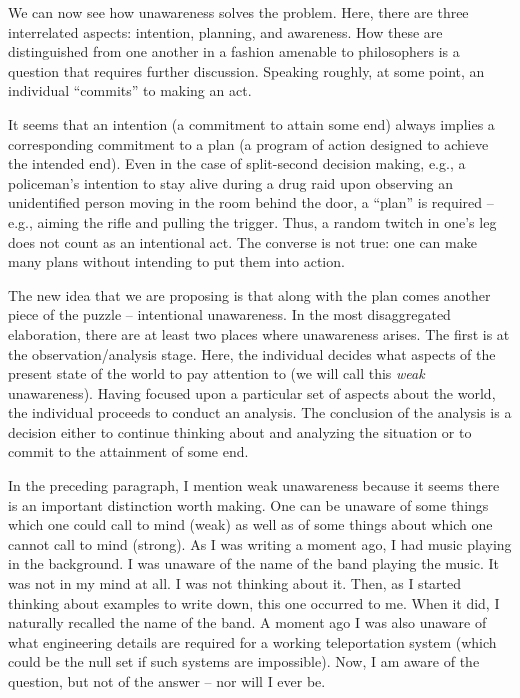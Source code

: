 \documentclass[
11pt,
titlepage,
reqno,
]{article}%
\theoremstyle{definition}
\begin{document}
We can now see how unawareness solves the problem. Here, there are three interrelated aspects: intention, planning, and awareness. How these are distinguished from one another in  a fashion amenable to philosophers is a question that requires further discussion. Speaking roughly, at some point, an individual ``commits'' to making an act.

It seems that an intention (a commitment to attain some end) always implies a corresponding commitment to a plan (a program of action designed to achieve the intended end).  Even in the case of split-second decision making, e.g., a policeman's intention to stay alive during a drug raid upon observing an unidentified person moving in the room behind the door, a ``plan'' is required -- e.g., aiming the rifle and pulling the trigger. Thus, a random twitch in one's leg does not count as an intentional act. The converse is not true: one can make many plans without intending to put them into action.

The new idea that we are proposing is that along with the plan comes another piece of the puzzle -- intentional unawareness. In the most disaggregated elaboration, there are at least two places where unawareness arises. The first is at the observation/analysis stage. Here, the individual decides what aspects of the present state of the world to pay attention to (we will call this \textit{weak} unawareness). Having focused upon a particular set of aspects about the world, the individual proceeds to conduct an analysis. The conclusion of the analysis is a decision either to continue thinking about and analyzing the situation or to commit to the attainment of some end. 

In the preceding paragraph, I mention weak unawareness because it seems there is an important distinction worth making. One can be unaware of some things which one could call to mind (weak) as well as of some things about which one cannot call to mind (strong). As I was writing a moment ago, I had music playing in the background. I was unaware of the name of the band playing the music. It was not in my mind at all. I was not thinking about it. Then, as I started thinking about examples to write down, this one occurred to me. When it did, I naturally recalled the name of the band. A moment ago I was also unaware of what engineering details are required for a working teleportation system (which could be the null set if such systems are impossible). Now, I am aware of the question, but not of the answer -- nor will I ever be. 
\end{document}
